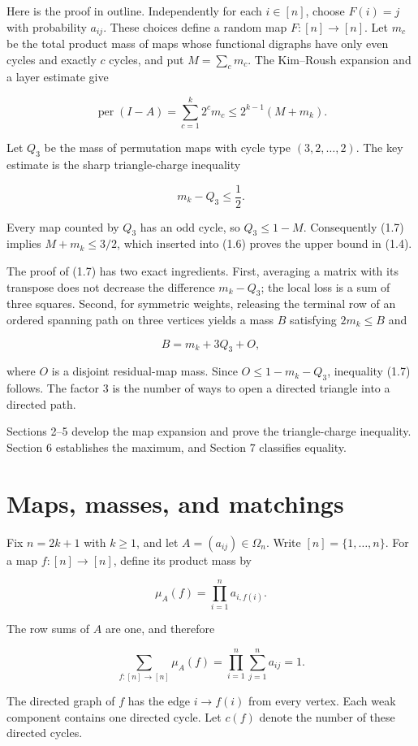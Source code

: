 \documentclass[11pt]{article}
\theoremstyle{remark}
\begin{document}
Here is the proof in outline. Independently for each $i\in[n]$, choose
$F(i)=j$ with probability $a_{ij}$. These choices define a random map
$F:[n]\to[n]$. Let $m_c$ be the total product mass of maps whose functional
digraphs have only even cycles and exactly $c$ cycles, and put
$M=\sum_c m_c$. The Kim--Roush expansion and a layer estimate give

\[
\operatorname{per}(I-A)=\sum_{c=1}^k2^c m_c
\le 2^{k-1}(M+m_k).
\tag{1.6}
\]

Let $Q_3$ be the mass of permutation maps with cycle type
$(3,2,\ldots,2)$. The key estimate is the sharp triangle-charge inequality

\[
m_k-Q_3\le\frac12.
\tag{1.7}
\]

Every map counted by $Q_3$ has an odd cycle, so $Q_3\le1-M$. Consequently
(1.7) implies $M+m_k\le3/2$, which inserted into (1.6) proves the upper
bound in (1.4).

The proof of (1.7) has two exact ingredients. First, averaging a matrix with
its transpose does not decrease the difference $m_k-Q_3$; the local loss is
a sum of three squares. Second, for symmetric weights, releasing the terminal
row of an ordered spanning path on three vertices yields a mass $B$ satisfying
$2m_k\le B$ and

\[
B=m_k+3Q_3+O,
\]

where $O$ is a disjoint residual-map mass. Since
$O\le1-m_k-Q_3$, inequality (1.7) follows. The factor $3$ is the number of
ways to open a directed triangle into a directed path.

Sections 2--5 develop the map expansion and prove the triangle-charge
inequality. Section 6 establishes the maximum, and Section 7 classifies
equality.

\section{Maps, masses, and matchings}

Fix $n=2k+1$ with $k\ge1$, and let $A=(a_{ij})\in\Omega_n$. Write
$[n]=\{1,\ldots,n\}$. For a map $f:[n]\to[n]$, define its product mass by

\[
\mu_A(f)=\prod_{i=1}^n a_{i,f(i)}.
\tag{2.1}
\]

The row sums of $A$ are one, and therefore

\[
\sum_{f:[n]\to[n]}\mu_A(f)=\prod_{i=1}^n\sum_{j=1}^n a_{ij}=1.
\tag{2.2}
\]

The directed graph of $f$ has the edge $i\to f(i)$ from every vertex.
Each weak component contains one directed cycle. Let $c(f)$ denote the
number of these directed cycles.
\end{document}
